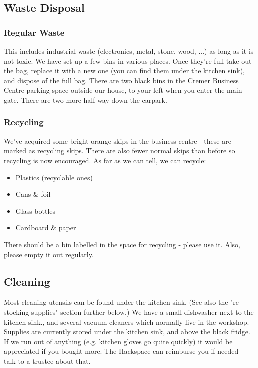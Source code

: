 \documentclass[11pt,a5paper,twoside]{memoir}
\begin{document}
\subsection{Waste Disposal}

\subsubsection{Regular Waste}

This includes industrial waste (electronics, metal, stone, wood, ...) as long as it is not toxic. We have set up a few bins in various places. Once they're full take out the bag, replace it with a new one (you can find them under the kitchen sink), and dispose of the full bag. There are two black bins in the Cremer Business Centre parking space outside our house, to your left when you enter the main gate. There are two more half-way down the carpark.

\subsubsection{Recycling}

We've acquired some bright orange skips in the business centre - these are marked as recycling skips. There are also fewer normal skips than before so recycling is now encouraged. As far as we can tell, we can recycle:

\begin{itemize}
	\item Plastics (recyclable ones)
	\item Cans \& foil
	\item Glass bottles
	\item Cardboard \& paper
\end{itemize}

There should be a bin labelled in the space for recycling - please use it. Also, please empty it out regularly.

\subsection{Cleaning}

Most cleaning utensils can be found under the kitchen sink. (See also the "re-stocking supplies" section further below.) We have a small dishwasher next to the kitchen sink., and several vacuum cleaners which normally live in the workshop. Supplies are currently stored under the kitchen sink, and above the black fridge. If we run out of anything (e.g. kitchen gloves go quite quickly) it would be appreciated if you bought more. The Hackspace can reimburse you if needed - talk to a trustee about that.
\end{document}
